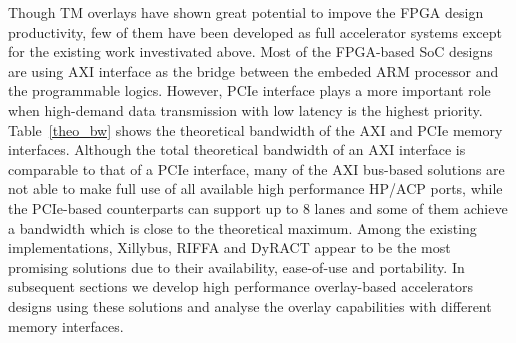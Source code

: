 Though TM overlays have shown great potential to impove the FPGA design productivity, few of them have been developed as full accelerator systems except for the existing work investivated above. 
Most of the FPGA-based SoC designs are using AXI interface as the bridge between the embeded ARM processor and the programmable logics. 
However, PCIe interface plays a more important role when high-demand data transmission with low latency is the highest priority. 
Table~\ref{theo_bw} shows the theoretical bandwidth of the AXI and PCIe memory interfaces. 
Although the total theoretical bandwidth of an AXI interface is comparable to that of a PCIe interface, many of the AXI bus-based solutions are not able to make full use of all available high performance HP/ACP ports, while the PCIe-based counterparts can support up to 8 lanes and some of them achieve a bandwidth which is close to the theoretical maximum. 
Among the existing implementations, Xillybus, RIFFA and DyRACT appear to be the most promising solutions due to their availability, ease-of-use and portability. 
In subsequent sections we develop high performance overlay-based accelerators designs using these solutions and analyse the overlay capabilities with different memory interfaces.


\begin{table}
	\caption{Theoretical bandwidth of typical memory interfaces.}
	\label{theo_bw}
	\centering
\end{table}
